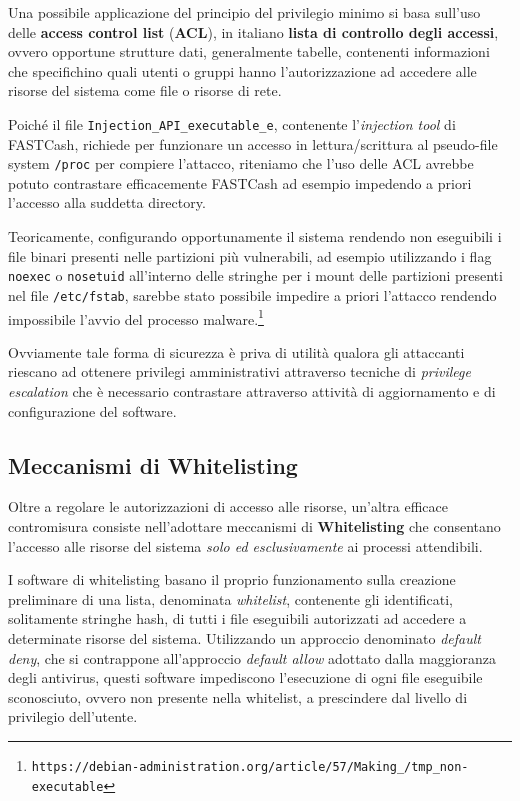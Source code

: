\documentclass[10pt,a4paper, titlepage]{report}
\begin{document}
Una possibile applicazione del principio del privilegio minimo si basa sull'uso delle \textbf{access control list} (\textbf{ACL}), in italiano \textbf{lista di controllo degli accessi}, ovvero opportune strutture dati, generalmente tabelle, contenenti informazioni che specifichino quali utenti o gruppi hanno l'autorizzazione ad accedere alle risorse del sistema come file o risorse di rete.

Poiché il file \texttt{Injection\_API\_executable\_e}, contenente l'\textit{injection tool} di FASTCash, richiede per funzionare un accesso in lettura/scrittura al pseudo-file system \texttt{/proc} per compiere l'attacco, riteniamo che l'uso delle ACL avrebbe potuto contrastare efficacemente FASTCash ad esempio impedendo a priori l'accesso alla suddetta directory.

Teoricamente, configurando opportunamente il sistema rendendo non eseguibili i file binari presenti nelle partizioni più vulnerabili, ad esempio utilizzando i flag \texttt{noexec} o \texttt{nosetuid} all'interno delle stringhe per i mount delle partizioni presenti nel file \texttt{/etc/fstab}, sarebbe stato possibile impedire a priori l'attacco rendendo impossibile l'avvio del processo malware.\footnote{\texttt{https://debian-administration.org/article/57/Making\_/tmp\_non-executable}}

Ovviamente tale forma di sicurezza è priva di utilità qualora gli attaccanti riescano ad ottenere privilegi amministrativi attraverso tecniche di \textit{privilege escalation} che è necessario contrastare attraverso attività di aggiornamento e di configurazione del software.

\subsection{Meccanismi di Whitelisting}

Oltre a regolare le autorizzazioni di accesso alle risorse, un'altra efficace contromisura consiste nell'adottare meccanismi di \textbf{Whitelisting} che consentano l'accesso alle risorse del sistema \textit{solo ed esclusivamente} ai processi attendibili. 

I software di whitelisting basano il proprio funzionamento sulla creazione preliminare di una lista, denominata \textit{whitelist}, contenente gli identificati, solitamente stringhe hash, di tutti i file eseguibili autorizzati ad accedere a determinate risorse del sistema. Utilizzando un approccio denominato \textit{default deny}, che si contrappone all'approccio \textit{default allow} adottato dalla maggioranza degli antivirus, questi software impediscono l'esecuzione di ogni file eseguibile sconosciuto, ovvero non presente nella whitelist, a prescindere dal livello di privilegio dell'utente.
\end{document}
